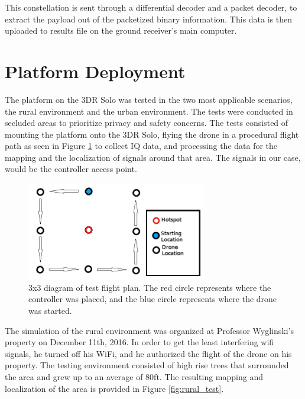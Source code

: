 This constellation is sent through a differential decoder and a packet decoder, to extract the payload out of the packetized binary information. This data is then uploaded to results file on the ground receiver’s main computer.

\section{Platform Deployment}
The platform on the 3DR Solo was tested in the two most applicable scenarios, the rural environment and the urban environment. The tests were conducted in secluded areas to prioritize privacy and safety concerns. The tests consisted of mounting the platform onto the 3DR Solo, flying the drone in a procedural flight path as seen in Figure \ref{fig:test_setup} to collect IQ data, and processing the data for the mapping and the localization of signals around that area. The signals in our case, would be the controller access point. 

\begin{figure}[ht!]
	\centering
	\includegraphics[width=0.70\textwidth]{img/Test_Plan_legend.png}
	\caption{3x3 diagram of test flight plan. The red circle represents where the controller was placed, and the blue circle represents where the drone was started.}
	\label{fig:test_setup}
\end{figure} \par

The simulation of the rural environment was organized at Professor Wyglinski's property on December 11th, 2016. In order to get the least interfering wifi signals, he turned off his WiFi, and he authorized the flight of the drone on his property. The testing environment consisted of high rise trees that surrounded the area and grew up to an average of 80ft. The resulting mapping and localization of the area is provided in Figure \ref{fig:rural_test}.

